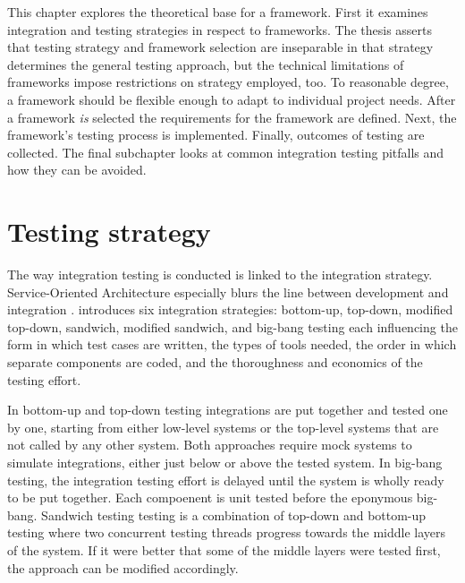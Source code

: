 \documentclass[12pt,a4paper,oneside,pdftex]{report}
\begin{document}
This chapter explores the theoretical base for a framework. First it examines integration and testing strategies in respect to frameworks. The thesis asserts that testing strategy and framework selection are inseparable in that strategy determines the general testing approach, but the technical limitations of frameworks impose restrictions on strategy employed, too. To reasonable degree, a framework should be flexible enough to adapt to individual project needs. After a framework \emph{is} selected the requirements for the framework are defined. Next, the framework's testing process is implemented. Finally, outcomes of testing are collected. The final subchapter looks at common integration testing pitfalls and how they can be avoided.

\section{Testing strategy}
The way integration testing is conducted is linked to the integration strategy. Service-Oriented Architecture especially blurs the line between development and integration \citep{huang2008surrogate, wieczorek2010model}. \citet{myers1976software} introduces six integration strategies: bottom-up, top-down, modified top-down, sandwich, modified sandwich, and big-bang testing each influencing the form in which test cases are written, the types of tools needed, the order in which separate components are coded, and the thoroughness and economics of the testing effort. 

In bottom-up and top-down testing integrations are put together and tested one by one, starting from either low-level systems or the top-level systems that are not called by any other system. Both approaches require mock systems to simulate integrations, either just below or above the tested system. In big-bang testing, the integration testing effort is delayed until the system is wholly ready to be put together. Each compoenent is unit tested before the eponymous big-bang. Sandwich testing testing is a combination of top-down and bottom-up testing where two concurrent testing threads progress towards the middle layers of the system. If it were better that some of the middle layers were tested first, the approach can be modified accordingly. \citep{burnstein2003practical, myers1976software}

\begin{comment} %
Other incremental testing methods include delivery, criticality, or functionality based 
strategies \citep{van2008identifying} where the system connections and hierarchy are built selectively an integration at a time. Further, \citet{carey1977control} discuss build testing. \citet{beizer1984software} introduces a "mixed bag" strategy which combines bottom-up, top-down, big-bang and build testing. 
\end{comment}
\end{document}
